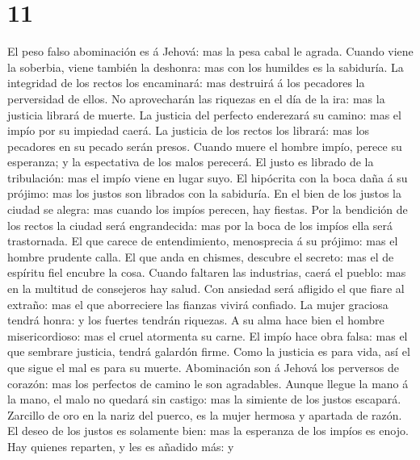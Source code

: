 \hypertarget{section-10}{%
\section{11}\label{section-10}}

 El peso falso abominación es á Jehová: mas la pesa cabal le
agrada.  Cuando viene la soberbia, viene también la
deshonra: mas con los humildes es la sabiduría.  La
integridad de los rectos los encaminará: mas destruirá á los pecadores
la perversidad de ellos.  No aprovecharán las riquezas en el
día de la ira: mas la justicia librará de muerte.  La
justicia del perfecto enderezará su camino: mas el impío por su impiedad
caerá.  La justicia de los rectos los librará: mas los
pecadores en su pecado serán presos.  Cuando muere el hombre
impío, perece su esperanza; y la espectativa de los malos perecerá.
 El justo es librado de la tribulación: mas el impío viene
en lugar suyo.  El hipócrita con la boca daña á su prójimo:
mas los justos son librados con la sabiduría.  En el bien
de los justos la ciudad se alegra: mas cuando los impíos perecen, hay
fiestas.  Por la bendición de los rectos la ciudad será
engrandecida: mas por la boca de los impíos ella será trastornada.
 El que carece de entendimiento, menosprecia á su prójimo:
mas el hombre prudente calla.  El que anda en chismes,
descubre el secreto: mas el de espíritu fiel encubre la cosa.
 Cuando faltaren las industrias, caerá el pueblo: mas en la
multitud de consejeros hay salud.  Con ansiedad será
afligido el que fiare al extraño: mas el que aborreciere las fianzas
vivirá confiado.  La mujer graciosa tendrá honra: y los
fuertes tendrán riquezas.  A su alma hace bien el hombre
misericordioso: mas el cruel atormenta su carne.  El impío
hace obra falsa: mas el que sembrare justicia, tendrá galardón firme.
 Como la justicia es para vida, así el que sigue el mal es
para su muerte.  Abominación son á Jehová los perversos de
corazón: mas los perfectos de camino le son agradables. 
Aunque llegue la mano á la mano, el malo no quedará sin castigo: mas la
simiente de los justos escapará.  Zarcillo de oro en la
nariz del puerco, es la mujer hermosa y apartada de razón. 
El deseo de los justos es solamente bien: mas la esperanza de los impíos
es enojo.  Hay quienes reparten, y les es añadido más: y
